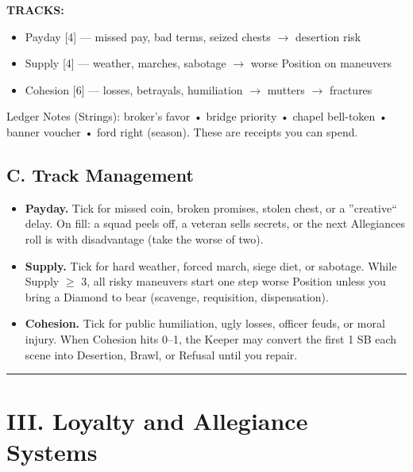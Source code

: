 \documentclass[11pt]{article}
\begin{document}
\textbf{TRACKS:}
\begin{itemize}
    \item Payday [4] --- missed pay, bad terms, seized chests $\rightarrow$ desertion risk
    \item Supply [4] --- weather, marches, sabotage $\rightarrow$ worse Position on maneuvers
    \item Cohesion [6] --- losses, betrayals, humiliation $\rightarrow$ mutters $\rightarrow$ fractures
\end{itemize}

Ledger Notes (Strings): broker's favor • bridge priority • chapel bell-token • banner voucher • ford right (season). These are receipts you can spend.

\subsection*{C. Track Management}
\begin{itemize}
    \item \textbf{Payday.} Tick for missed coin, broken promises, stolen chest, or a ''creative`` delay. On fill: a squad peels off, a veteran sells secrets, or the next Allegiances roll is with disadvantage (take the worse of two).
    \item \textbf{Supply.} Tick for hard weather, forced march, siege diet, or sabotage. While Supply $\geq$ 3, all risky maneuvers start one step worse Position unless you bring a Diamond to bear (scavenge, requisition, dispensation).
    \item \textbf{Cohesion.} Tick for public humiliation, ugly losses, officer feuds, or moral injury. When Cohesion hits 0--1, the Keeper may convert the first 1 SB each scene into Desertion, Brawl, or Refusal until you repair.
\end{itemize}

\rule{\textwidth}{0.4pt}

\section*{III. Loyalty and Allegiance Systems}
\end{document}
